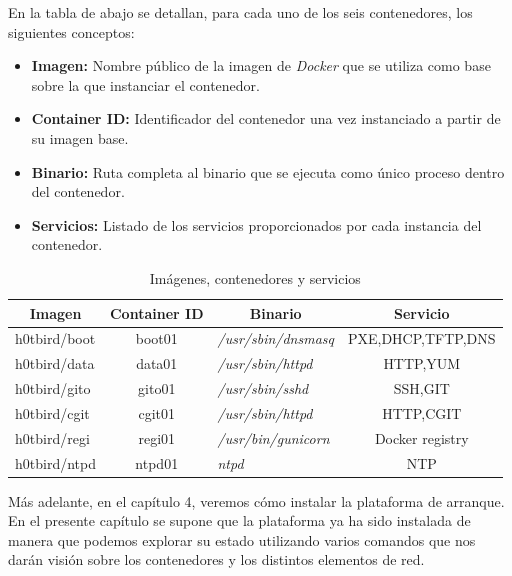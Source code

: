 \documentclass[a4paper,12pt,spanish,final]{epsc_tfc_pfc}
\begin{document}
En la tabla de abajo se detallan, para cada uno de los seis contenedores, los siguientes conceptos:

\begin{itemize}[leftmargin=20pt]
  \item \textbf{Imagen:} Nombre público de la imagen de \emph{Docker} que se utiliza como base sobre la que instanciar el contenedor.
  \item \textbf{Container ID:} Identificador del contenedor una vez instanciado a partir de su imagen base.
  \item \textbf{Binario:} Ruta completa al binario que se ejecuta como único proceso dentro del contenedor.
  \item \textbf{Servicios:} Listado de los servicios proporcionados por cada instancia del contenedor.
\end{itemize}

\vspace{30pt}

\begin{table}[h]
\centering
\begin{tabular}{|l|c|l|c|}
\hline
\multicolumn{1}{|c|}{\textbf{Imagen}}    & \textbf{Container ID} & \multicolumn{1}{c|}{\textbf{Binario}} & \textbf{Servicio} \\ \hline
h0tbird/boot                             & boot01                & \textit{/usr/sbin/dnsmasq}            & PXE,DHCP,TFTP,DNS \\ \hline
h0tbird/data                             & data01                & \textit{/usr/sbin/httpd}              & HTTP,YUM          \\ \hline
h0tbird/gito                             & gito01                & \textit{/usr/sbin/sshd}               & SSH,GIT           \\ \hline
h0tbird/cgit                             & cgit01                & \textit{/usr/sbin/httpd}              & HTTP,CGIT         \\ \hline
h0tbird/regi                             & regi01                & \textit{/usr/bin/gunicorn}            & Docker registry   \\ \hline
h0tbird/ntpd                             & ntpd01                & \textit{ntpd}                         & NTP               \\ \hline
\end{tabular}
\caption{Imágenes, contenedores y servicios}
\end{table}

Más adelante, en el capítulo 4, veremos cómo instalar la plataforma de arranque. En el presente capítulo se supone que la plataforma ya ha sido instalada de manera que podemos explorar su estado utilizando varios comandos que nos darán visión sobre los contenedores y los distintos elementos de red.
\end{document}
